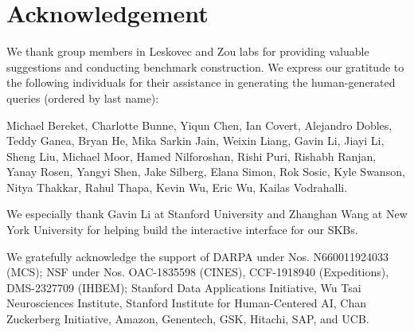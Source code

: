 
\section{Acknowledgement}
We thank group members in Leskovec and Zou labs for providing valuable suggestions and conducting benchmark construction. We express our gratitude to the following individuals for their assistance in generating the human-generated queries (ordered by last name):  

Michael Bereket, Charlotte Bunne, Yiqun Chen, Ian Covert, 
Alejandro Dobles, Teddy Ganea, Bryan He, Mika Sarkin Jain, Weixin Liang, Gavin Li, Jiayi Li, 
Sheng Liu, Michael Moor, Hamed Nilforoshan, Rishi Puri, Rishabh Ranjan, Yanay Rosen, Yangyi Shen, Jake Silberg, Elana Simon, Rok Sosic, Kyle Swanson, Nitya Thakkar, Rahul Thapa, Kevin Wu, Eric Wu, Kailas Vodrahalli. 

We especially thank Gavin Li at Stanford University and Zhanghan Wang at New York University for helping build the interactive interface for our SKBs.


We gratefully acknowledge the support of
DARPA under Nos. N660011924033 (MCS);
NSF under Nos. OAC-1835598 (CINES), CCF-1918940 (Expeditions), DMS-2327709 (IHBEM);
Stanford Data Applications Initiative,
Wu Tsai Neurosciences Institute,
Stanford Institute for Human-Centered AI,
Chan Zuckerberg Initiative,
Amazon, Genentech, GSK, Hitachi, SAP, and UCB.

